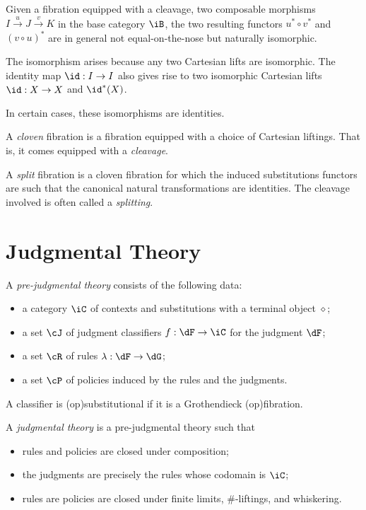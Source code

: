 \documentclass{amsart}
\begin{document}
Given a fibration equipped with a cleavage, two composable morphisms $I \overset{u}{\to} J \overset{v}{\to} K$ in the base category $\iB$, the two resulting functors $u^{*} \circ v^{*}$ and $(v \circ u)^{*}$ are in general not equal-on-the-nose but naturally isomorphic.

The isomorphism arises because any two Cartesian lifts are isomorphic.
The identity map $\id : I \to I$ also gives rise to two isomorphic Cartesian lifts $\id : X \to X$ and $\id^{*}(X)$.

In certain cases, these isomorphisms are identities.

\begin{defn}
  A \emph{cloven} fibration is a fibration equipped with a choice of Cartesian liftings.
  That is, it comes equipped with a \emph{cleavage}.
\end{defn}

\begin{defn}
  A \emph{split} fibration is a cloven fibration for which the induced substitutions functors are such that the canonical natural transformations are identities.
  The cleavage involved is often called a \emph{splitting}.
\end{defn}

\section{Judgmental Theory}
\label{sec:judgmental-theory}
\begin{defn}
  A \emph{pre-judgmental theory} consists of the following data:
  \begin{itemize}
  \item a category $\iC$ of contexts and substitutions with a terminal object $\diamond$;
  \item a set $\cJ$ of judgment classifiers $f : \dF \to \iC$ for the judgment $\dF$;
  \item a set $\cR$ of rules $\lambda : \dF \to \dG$;
  \item a set $\cP$ of policies induced by the rules and the judgments.
  \end{itemize}
\end{defn}
A classifier is (op)substitutional if it is a Grothendieck (op)fibration.

\begin{defn}
  A \emph{judgmental theory} is a pre-judgmental theory such that
  \begin{itemize}
  \item rules and policies are closed under composition;
  \item the judgments are precisely the rules whose codomain is $\iC$;
  \item rules are policies are closed under finite limits, $\#$-liftings, and whiskering.
  \end{itemize}
\end{defn}
\end{document}
